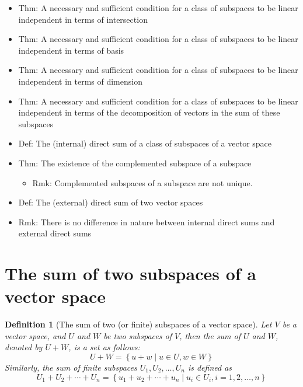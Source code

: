\documentclass[onecolumn]{ctexart}
\newtheorem{definition}{Definition}
\begin{document}
\begin{itemize}
\begin{itemize}
\begin{itemize}
    \end{itemize}
    \item Thm: A necessary and sufficient condition for a class of subspaces to be linear independent in terms of intersection
    \item Thm: A necessary and sufficient condition for a class of subspaces to be linear independent in terms of basis
    \item Thm: A necessary and sufficient condition for a class of subspaces to be linear independent in terms of dimension
    \item Thm: A necessary and sufficient condition for a class of subspaces to be linear independent in terms of the decomposition of vectors in the sum of these subspaces
    \item Def: The (internal) direct sum of a class of subspaces of a vector space
    \item Thm: The existence of the complemented subspace of a subspace
    \begin{itemize}
      \item Rmk: Complemented subspaces of a subspace are not unique.
    \end{itemize}
    \item Def: The (external) direct sum of two vector spaces
    \item Rmk: There is no difference in nature between internal direct sums and external direct sums
  \end{itemize}
\end{itemize}

\section{The sum of two subspaces of a vector space}

\begin{definition}[The sum of two (or finite) subspaces of a vector space]
  Let $V$ be a vector space, and $U$ and $W$ be two subspaces of $V$, then the sum of $U$ and $W$, denoted by $U + W$, is a set as follows:
  \begin{equation}
    U + W = \left\{ u + w \mid u \in U, w \in W \right\} 
  \end{equation}
  Similarly, the sum of finite subspaces $U_1, U_2, \ldots, U_n$ is defined as
  \begin{equation}
    U_1 + U_2 + \cdots + U_n = \left\{ u_1 + u_2 + \cdots + u_n \mid u_i \in U_i, i = 1,2,\ldots,n \right\}
  \end{equation}
\end{definition}
\end{document}
